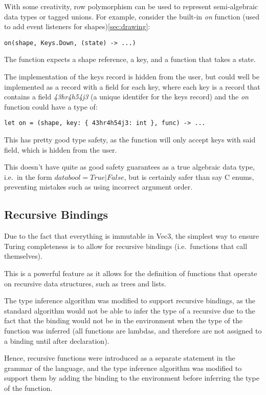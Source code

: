 With some creativity, row polymorphism can be used to represent semi-algebraic data types or tagged unions.
For example, consider the built-in \textit{on} function (used to add event listeners for shapes)\ref{sec:drawing}:

\begin{verbatim}
on(shape, Keys.Down, (state) -> ...)
\end{verbatim}

The function expects a shape reference, a key, and a function that takes a state.

The implementation of the keys record is hidden from the user, but could well be implemented as a record with a field
for each key, where each key is a record that contains a field 
\textit{43hr4h54j3} (a unique identifer for the keys record) and the \textit{on} function could have a type of:
\begin{verbatim}
let on = (shape, key: { 43hr4h54j3: int }, func) -> ...
\end{verbatim}

This has pretty good type safety, as the function will only accept keys with said field, which is hidden from the user.

This doesn't have quite as good safety guarantees as a true algebraic data type, i.e.\ in the form 
$data bool = True | False$, but is certainly safer than say C enums, preventing mistakes such as using incorrect 
argument order.

\subsection{Recursive Bindings}\label{subsec:recursive-bindings}

Due to the fact that everything is immutable in Vec3, the simplest way to ensure Turing completeness is to allow for 
recursive bindings (i.e.\ functions that call themselves).

This is a powerful feature as it allows for the definition of functions that operate on recursive data structures, such
as trees and lists.

The type inference algorithm was modified to support recursive bindings, as the standard algorithm would not be able to
infer the type of a recursive due to the fact that the binding would not be in the environment when the type of the
function was inferred (all functions are lambdas, and therefore are not assigned to a binding until after declaration).

Hence, recursive functions were introduced as a separate statement in the grammar of the language, and the type
inference algorithm was modified to support them by adding the binding to the environment before inferring the type of
the function.

